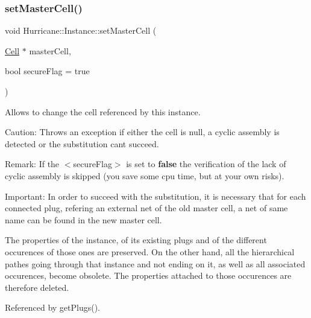 \mbox{\label{classHurricane_1_1Instance_a9f626fd058c21ffc2ed5bfee8d29a853}} 
\subsubsection{\texorpdfstring{set\+Master\+Cell()}{setMasterCell()}}
{\footnotesize\ttfamily void Hurricane\+::\+Instance\+::set\+Master\+Cell (\begin{DoxyParamCaption}\item[{\hyperlink{classHurricane_1_1Cell}{Cell} $\ast$}]{master\+Cell,  }\item[{bool}]{secure\+Flag = {\ttfamily true} }\end{DoxyParamCaption})}

Allows to change the cell referenced by this instance.

\begin{DoxyParagraph}{Caution\+:}
Throws an exception if either the cell is null, a cyclic assembly is detected or the substitution can\textquotesingle{}t succeed.
\end{DoxyParagraph}
\begin{DoxyParagraph}{Remark\+:}
If the {\ttfamily $<$secure\+Flag$>$} is set to {\bfseries false} the verification of the lack of cyclic assembly is skipped (you save some cpu time, but at your own risks).
\end{DoxyParagraph}
\begin{DoxyParagraph}{Important\+:}
In order to succeed with the substitution, it is necessary that for each connected plug, refering an external net of the old master cell, a net of same name can be found in the new master cell.
\end{DoxyParagraph}
The properties of the instance, of its existing plugs and of the different occurences of those ones are preserved. On the other hand, all the hierarchical pathes going through that instance and not ending on it, as well as all associated occurences, become obsolete. The properties attached to those occurences are therefore deleted. 

Referenced by get\+Plugs().

\mbox{\label{classHurricane_1_1Instance_adf28fcd01f6ff89c5435e83482f66d4c}} 
